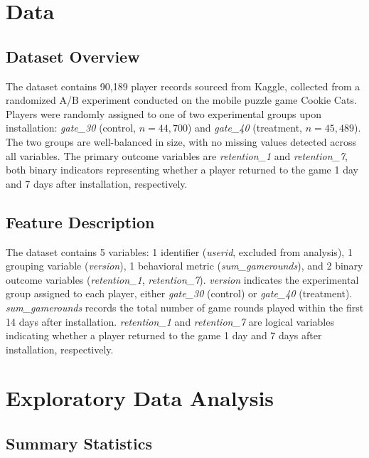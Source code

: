 \documentclass[12pt]{article}
\begin{document}
\section{Data}

\subsection{Dataset Overview}

The dataset contains 90,189 player records sourced from Kaggle, collected from a randomized 
A/B experiment conducted on the mobile puzzle game Cookie Cats. Players were randomly assigned 
to one of two experimental groups upon installation: \textit{gate\_30} (control, $n = 44{,}700$) 
and \textit{gate\_40} (treatment, $n = 45{,}489$). The two groups are well-balanced in size, 
with no missing values detected across all variables. The primary outcome variables are 
\textit{retention\_1} and \textit{retention\_7}, both binary indicators representing whether 
a player returned to the game 1 day and 7 days after installation, respectively.

\subsection{Feature Description}

The dataset contains 5 variables: 1 identifier (\textit{userid}, excluded from analysis), 
1 grouping variable (\textit{version}), 1 behavioral metric (\textit{sum\_gamerounds}), 
and 2 binary outcome variables (\textit{retention\_1}, \textit{retention\_7}). 
\textit{version} indicates the experimental group assigned to each player, either 
\textit{gate\_30} (control) or \textit{gate\_40} (treatment). \textit{sum\_gamerounds} 
records the total number of game rounds played within the first 14 days after installation. 
\textit{retention\_1} and \textit{retention\_7} are logical variables indicating whether 
a player returned to the game 1 day and 7 days after installation, respectively.

\section{Exploratory Data Analysis}

\subsection{Summary Statistics}
\end{document}
